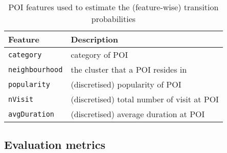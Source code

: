 \begin{table}[ht]
\caption{POI features used to estimate the (feature-wise) transition probabilities}
\label{tab:tranfeature}
\centering
\begin{tabular}{l|l} \hline
\textbf{Feature}       & \textbf{Description} \\ \hline
\texttt{category}      & category of POI \\
\texttt{neighbourhood} & the cluster that a POI resides in \\
\texttt{popularity}    & (discretised) popularity of POI \\
\texttt{nVisit}        & (discretised) total number of visit at POI \\
\texttt{avgDuration}  & (discretised) average duration at POI \\ \hline
\end{tabular}
\end{table}



\subsection{Evaluation metrics}
\label{sec:metric}


